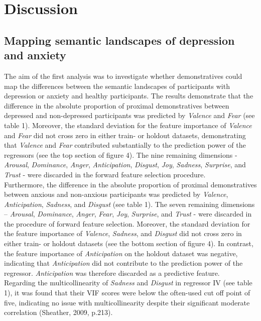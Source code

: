 \documentclass[11pt, a4paper]{article}
\begin{document}
\newpage

\section{Discussion}
\subsection{Mapping semantic landscapes of depression and anxiety}
The aim of the first analysis was to investigate whether demonstratives could map the differences between the semantic landscapes of participants with depression or anxiety and healthy participants. The results demonstrate that the difference in the absolute proportion of proximal demonstratives between depressed and non-depressed participants was predicted by \textit{Valence} and \textit{Fear} (see table 1). Moreover, the standard deviation for the feature importance of \textit{Valence} and \textit{Fear} did not cross zero in either train- or holdout datasets, demonstrating that \textit{Valence} and \textit{Fear} contributed substantially to the prediction power of the regressors (see the top section of figure 4). The nine remaining dimensions - \textit{Arousal}, \textit{Dominance}, \textit{Anger}, \textit{Anticipation}, \textit{Disgust}, \textit{Joy}, \textit{Sadness}, \textit{Surprise}, and \textit{Trust} - were discarded in the forward feature selection procedure. \\

Furthermore, the difference in the absolute proportion of proximal demonstratives between anxious and non-anxious participants was predicted by \textit{Valence}, \textit{Anticipation}, \textit{Sadness}, and \textit{Disgust} (see table 1). The seven remaining dimensions – \textit{Arousal}, \textit{Dominance}, \textit{Anger}, \textit{Fear}, \textit{Joy}, \textit{Surprise}, and \textit{Trust} - were discarded in the procedure of forward feature selection. Moreover, the standard deviation for the feature importance of \textit{Valence}, \textit{Sadness}, and \textit{Disgust} did not cross zero in either train- or holdout datasets (see the bottom section of
figure 4). In contrast, the feature importance of \textit{Anticipation} on the holdout dataset was negative, indicating that \textit{Anticipation} did not contribute to the prediction power of the regressor. \textit{Anticipation} was therefore discarded as a predictive feature. \\
Regarding the multicollinearity of \textit{Sadness} and \textit{Disgust} in regressor IV (see table 1), it was found that their VIF scores were below the often-used cut off point of five, indicating no issue with multicollinearity despite their significant moderate correlation (Sheather, 2009, p.213).\\
\end{document}
